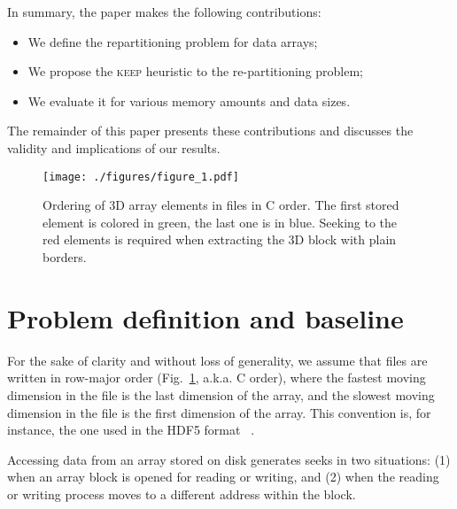 \documentclass[sigconf, nonacm]{acmart}
\newcommand{\keep}[0]{\textsc{keep}\xspace}
\begin{document}
In summary, the paper makes the following contributions:
\begin{itemize}
  \item We define the repartitioning problem for data arrays;
  \item We propose the \keep heuristic to the re-partitioning problem;
  \item We evaluate it for various memory amounts and data sizes.
\end{itemize}
The remainder of this paper presents these contributions and discusses the
validity and implications of our results.


\begin{figure}
  \centering
  \texttt{[image: ./figures/figure\_1.pdf]}
  \caption{Ordering of 3D array elements in files in C order. The first stored element is colored in green,
  the last one is in blue. Seeking to the red elements is required when extracting the 3D block with plain borders.}
  \label{fig:seeks_and_rowmajor}
\end{figure}

\section{Problem definition and baseline}


For the sake of clarity and without loss of generality, we assume that
 files are written in row-major order (Fig.~\ref{fig:seeks_and_rowmajor},
 a.k.a. C order), where the fastest moving dimension in the file is the
 last dimension of the array, and the slowest moving dimension in the file
 is the first dimension of the array. This convention is, for instance, the
 one used in the HDF5 format ~\cite{hdf5}.

Accessing data from an array stored on disk generates seeks in two
situations: (1) when an array block is opened for reading or writing, and
(2) when the reading or writing process moves to a different address within
the block.
\end{document}
